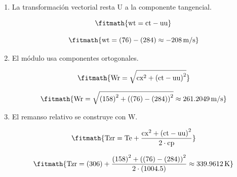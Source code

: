 \begin{enumerate}

\item La transformación vectorial resta U a la componente tangencial.

\[\fitmath{\mathrm{wt}=\mathrm{ct}-\mathrm{uu}}\]

\[\fitmath{\mathrm{wt}=(76)-(284)\approx -208\,\mathrm{m/s}}\]

\item El módulo usa componentes ortogonales.

\[\fitmath{\mathrm{Wr}=\sqrt{{\mathrm{cx}}^{2}+{\left(\mathrm{ct}-\mathrm{uu}\right)}^{2}}}\]

\[\fitmath{\mathrm{Wr}=\sqrt{{(158)}^{2}+{\left((76)-(284)\right)}^{2}}\approx 261.2049\,\mathrm{m/s}}\]

\item El remanso relativo se construye con W.

\[\fitmath{\mathrm{Tzr}=\mathrm{Te}+\frac{{\mathrm{cx}}^{2}+{\left(\mathrm{ct}-\mathrm{uu}\right)}^{2}}{2\cdot \mathrm{cp}}}\]

\[\fitmath{\mathrm{Tzr}=(306)+\frac{{(158)}^{2}+{\left((76)-(284)\right)}^{2}}{2\cdot (1004.5)}\approx 339.9612\,\mathrm{K}}\]

\end{enumerate}
